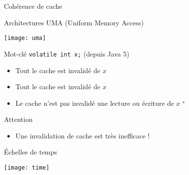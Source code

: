 \begin{frame}[fragile]{Cohérence de cache}
  \begin{block}{Architectures UMA (Uniform Memory Access)}
    \begin{center}
      \texttt{[image: uma]}
    \end{center}
  \end{block}
  \begin{exampleblock}{Mot-clé \lstinline{volatile int x;} (depuis Java 5)}
    \begin{itemize}
    \item Tout le cache est invalidé   de $x$
    \item Tout le cache est invalidé  de $x$
    \item Le cache n'est pas invalidé  une lecture ou écriture de $x$ $^\star$
    \end{itemize}
  \end{exampleblock}
  \begin{alertblock}{Attention}
    \begin{itemize}
    \item Une invalidation de cache est très inefficace !
    \end{itemize}
  \end{alertblock}

\vfill

\fontsize{4}{4}

\end{frame}


\begin{frame}{Échelles de temps}
   \begin{center}
      \texttt{[image: time]}\\
   \end{center}
\end{frame}


